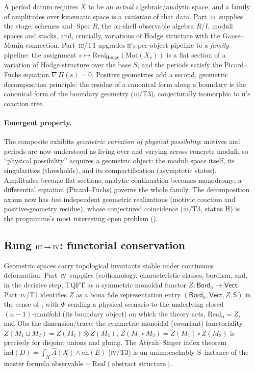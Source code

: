 \documentclass[12pt]{article}
\theoremstyle{definition}
\theoremstyle{remark}
\newcommand{\Vect}{\mathsf{Vect}}
\newcommand{\Bord}{\mathsf{Bord}}
\newcommand{\Real}{\mathrm{Real}}
\newcommand{\Obs}{\mathrm{Obs}}
\newcommand{\Spec}{\operatorname{Spec}}
\newcommand{\Sstat}{\textsf{S}}
\newcommand{\Hstat}{\textsf{H}}
\newcommand{\Mot}{\mathrm{Mot}}
\newcommand{\PII}{\textsc{ii}}
\newcommand{\PIII}{\textsc{iii}}
\newcommand{\PIV}{\textsc{iv}}
\begin{document}
A period datum requires $X$ to be an \emph{actual} algebraic/analytic space, and a
family of amplitudes over kinematic space is a \emph{variation} of that data.
Part~\PIII\ supplies the stage: schemes and $\Spec R$, the on-shell observable
algebra $R/I$, moduli spaces and stacks, and, crucially, variations of Hodge
structure with the Gauss--Manin connection.  Part~\PIII/T1 upgrades \PII's per-object
pipeline to a \emph{family} pipeline: the assignment $s\mapsto
\Real_{\text{Hodge}}(\Mot(X_s))$ is a flat section of a variation of Hodge structure
over the base $S$, and the periods satisfy the Picard--Fuchs equation
$\nabla\,\Pi(s)=0$.  Positive geometries add a second, geometric decomposition
principle: the residue of a canonical form along a boundary is the canonical form of
the boundary geometry (\PIII/T3), conjecturally isomorphic to \PII's coaction tree.

\paragraph{Emergent property.}
The composite exhibits \emph{geometric variation of physical possibility}: motives and
periods are now understood as living over and varying across concrete moduli, so
``physical possibility'' acquires a geometric object: the moduli space itself, its
singularities (thresholds), and its compactification (asymptotic states).  Amplitudes
become flat sections; analytic continuation becomes monodromy; a differential equation
(Picard--Fuchs) governs the whole family.  The decomposition axiom now has \emph{two}
independent geometric realizations (motivic coaction and positive-geometry residue),
whose conjectured coincidence (\PIII/T3, status \Hstat) is the programme's most
interesting open problem ().

\subsection{Rung \texorpdfstring{$\PIII\to\PIV$}{III to IV}: functorial conservation}
\label{sec:rung4}

Geometric spaces carry topological invariants stable under continuous deformation.
Part~\PIV\ supplies (co)homology, characteristic classes, bordism, and, in the
decisive step, TQFT as a symmetric monoidal functor $Z:\Bord_n\to\Vect$.
Part~\PIV/T1 identifies $Z$ as a bona fide representation entry
$(\Bord_n,\Vect,Z,\Sstat)$ in the sense of , with $\Phi$ sending a
physical scenario to the underlying closed $(n{-}1)$-manifold (its boundary object) on
which the theory acts, $\Real_\alpha=Z$, and $\Obs$ the dimension/trace; the
symmetric monoidal (covariant) functoriality $Z(M_1\sqcup M_2)=Z(M_1)\otimes Z(M_2)$,
$Z(M_1\circ M_2)=Z(M_1)\circ Z(M_2)$ is precisely  for disjoint unions
and gluing.  The Atiyah--Singer index theorem $\mathrm{ind}(D)=\int_X\hat A(X)\wedge
\mathrm{ch}(E)$ (\PIV/T3) is an unimpeachably \Sstat\ instance of the master formula
$\text{observable}=\Real(\text{abstract structure})$.
\end{document}
